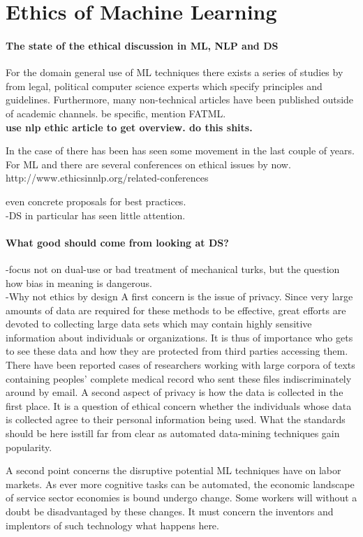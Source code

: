 \documentclass{article}
\begin{document}
\section{Ethics of Machine Learning}
\paragraph{The state of the ethical discussion in ML, NLP and DS}
For the domain general use of ML techniques there exists a series of studies by from legal, political computer science experts which specify principles and guidelines. Furthermore, many non-technical articles have been published outside of academic channels. 
be specific, mention FATML. \\
\textbf{use nlp ethic article to get overview. do this shits.}

In the case of  there has been  has seen some movement in the last couple of years.
For ML and  there are several  conferences on ethical issues by now.
http://www.ethicsinnlp.org/related-conferences

 even concrete proposals for best practices.\\
-DS in particular has seen little attention.

\paragraph{What good should come from looking at DS?}
-focus not on dual-use or bad treatment of mechanical turks, but the question how bias in meaning is dangerous.\\
-Why not ethics by design
A first concern is the issue of privacy. Since very large amounts of data are required for these methods to be effective, great efforts are devoted to collecting large data sets which may contain highly sensitive information about individuals or organizations. It is thus of importance who gets to see these data and how they are protected from third parties accessing them. There have been reported cases of researchers working with large corpora of texts containing peoples' complete medical record who sent these files indiscriminately around by email. A second aspect of privacy is how the data is collected in the first place. It is a question of ethical concern whether the individuals whose data is collected agree to their personal information being used. What the standards should be here isstill  far from clear as automated data-mining techniques gain popularity.

A second point concerns the disruptive potential ML techniques have on labor markets. As ever more cognitive tasks can be automated, the economic landscape of service sector economies is bound undergo change. Some workers will without a doubt be disadvantaged by these changes. It must concern the inventors and implentors of such technology what happens here.
\end{document}
